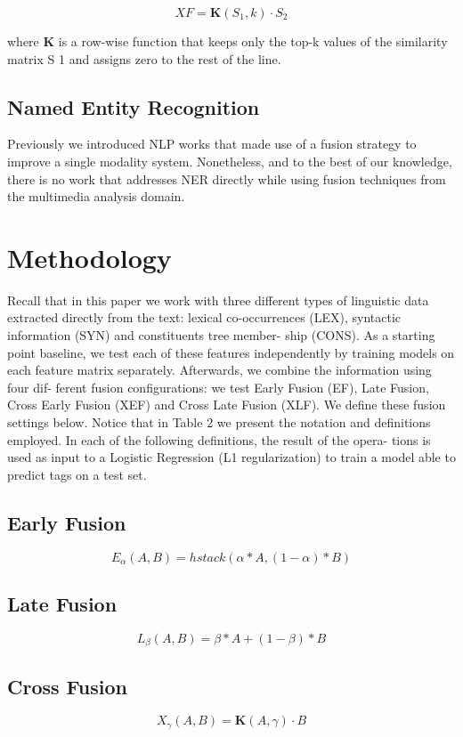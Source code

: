 \documentclass[11pt]{article}
\begin{document}
\begin{equation}
XF = \mathbf{K}(S_1, k) \cdot S_2
\end{equation}

where $\mathbf{K}$ is a row-wise function that keeps only the top-k values of the similarity matrix S 1 and
assigns zero to the rest of the line.

\subsection{Named Entity Recognition}
Previously we introduced NLP works that made use of a fusion strategy to improve a single modality system. Nonetheless, and to the best of our knowledge, there is no work that addresses NER directly while using fusion techniques from the
multimedia analysis domain.

\section{Methodology}
Recall that in this paper we work with three different types of linguistic data extracted directly from
the text: lexical co-occurrences (LEX), syntactic information (SYN) and constituents tree member-
ship (CONS). As a starting point baseline, we test each of these features independently by training
models on each feature matrix separately. Afterwards, we combine the information using four dif-
ferent fusion configurations: we test Early Fusion (EF), Late Fusion, Cross Early Fusion (XEF) and
Cross Late Fusion (XLF). We define these fusion settings below. Notice that in Table 2 we present
the notation and definitions employed. In each of the following definitions, the result of the opera-
tions is used as input to a Logistic Regression (L1 regularization) to train a model able to predict tags
on a test set. 
%
%

\subsection*{Early Fusion}
$$
E_\alpha(A,B) = hstack(\alpha * A , (1-\alpha)*B)
$$
\subsection*{Late Fusion}
$$
L_\beta(A,B) = \beta * A + (1 - \beta) * B
$$
\subsection*{Cross  Fusion}
$$
X_{\gamma}(A,B) = \mathbf{K}(A,\gamma) \cdot B
$$
\vspace{.5cm}
\end{document}
